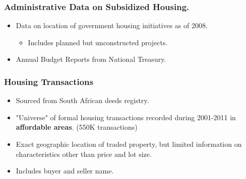 \documentclass[aspectratio=32]{beamer}
\begin{document}

\begin{frame}
\frametitle{Administrative Data on Subsidized Housing.}

  \begin{itemize}
    \item Data on location of government housing initiatives as of 2008.
    \begin{itemize} 
      \item Includes planned but unconstructed projects.
    \end{itemize}

    \item Annual Budget Reports from National Treasury. 
    
  \end{itemize}
\end{frame}


\begin{frame}
\frametitle{Housing Transactions}

\begin{itemize}

  \item Sourced from South African deeds registry. 
  \vspace{2mm}
  \item "Universe" of formal housing transactions recorded during 2001-2011 in
{\bf affordable areas}. (550K transactions)
  \vspace{2mm}
  \item Exact geographic location of traded property, but limited information
on characteristics other than price and lot size.
  \vspace{2mm}
  \item Includes buyer and seller name.
\end{itemize}
\end{frame}

\end{document}
